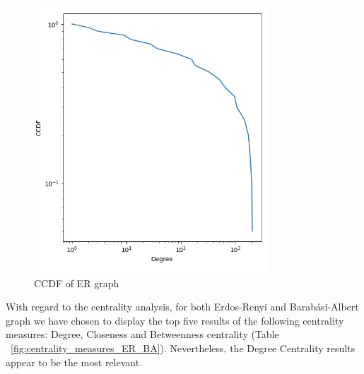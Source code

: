 \documentclass[sigchi]{acmart}
\begin{document}
\begin{figure}[hbpt]
  \centering
  \includegraphics[width=0.8\linewidth]{img/CCDF_ER.png}
  \caption{CCDF of ER graph}
  \label{fig:CCDF_ER}
\end{figure}

With regard to the centrality analysis, for both Erdos-Renyi and Barabási-Albert graph we have chosen to display the top five results of the following centrality measures: Degree, Closeness and Betweenness centrality (Table ~\ref{fig:centrality_measures_ER_BA}). Nevertheless, the Degree Centrality results appear to be the most relevant. 

\begin{table}[h]
\centering
\caption{Centrality Measures in ER and BA graphs}
\end{table}
\end{document}
